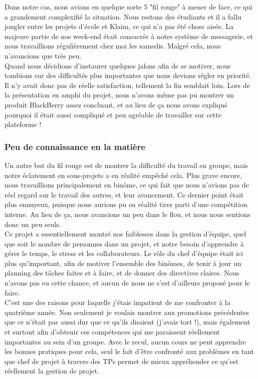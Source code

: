 \documentclass{article}
\begin{document}
		Dans notre cas, nous avions en quelque sorte 5 "fil rouge" à mener de face, ce qui a grandement complexifié la situation. Nous restons des étudiants et il a fallu jongler entre les projets d'école et Klaim, ce qui n'a pas été chose aisée. La majeure partie de nos week-end était consacrée à notre système de messagerie, et nous travaillions régulièrement chez moi les samedis. Malgré cela, nous n'avancions que très peu.\\ 
		
		Quand nous décidions d'instaurer quelques jalons afin de se motiver, nous tombions sur des difficultés plus importantes que nous devions régler en priorité. Il n'y avait donc pas de réelle satisfaction, tellement la fin semblait loin. Lors de la présentation en amphi du projet, nous n'avons même pas pu montrer un produit BlackBerry assez concluant, et au lieu de ça nous avons expliqué pourquoi il était aussi compliqué et peu agréable de travailler sur cette plateforme ! \\
		
		\subsubsection{Peu de connaissance en la matière}
		Un autre but du fil rouge est de montrer la difficulté du travail en groupe, mais notre éclatement en sous-projets a en réalité empêché cela. Plus grave encore, nous travaillions principalement en binôme, ce qui fait que nous n'avions pas de réel regard sur le travail des autres, et leur avancement. Ce dernier point était plus ennuyeux, puisque nous aurions pu en réalité tirer parti d'une compétition interne. Au lieu de ça, nous avancions un peu dans le flou, et nous nous sentions donc un peu seuls.\\
		
		Ce projet a essentiellement montré nos faiblesses dans la gestion d'équipe, quel que soit le nombre de personnes dans un projet, et notre besoin d'apprendre à gérer le temps, le stress et les collaborateurs. Le rôle du chef d'équipe était ici plus qu'important, afin de motiver l'ensemble des binômes, de tenir à jour un planning des tâches faites et à faire, et de donner des directives claires. Nous n'avons pas eu cette chance, et aucun de nous ne s'est d'ailleurs proposé pour le faire. \\
		
		C'est une des raisons pour laquelle j'étais impatient de me confronter à la quatrième année. Non seulement je voulais montrer aux promotions précédentes que ce n'était pas aussi dur que ce qu'ils disaient (j'avais tort !), mais également et surtout afin d'obtenir ces compétences qui me paraissent réellement importantes au sein d'un groupe. Avec le recul, aucun cours ne peut apprendre les bonnes pratiques pour cela, seul le fait d'être confronté aux problèmes en tant que chef de projet à travers des TPs permet de mieux appréhender ce qu'est réellement la gestion de projet.
\end{document}
